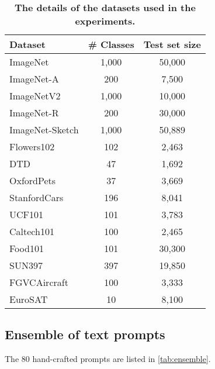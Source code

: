 \begin{table}[t]
\centering
\caption{\textbf{The details of the datasets used in the experiments.}}
\label{tab:dataset}
\begin{tabular}{lcc}
\toprule
\textbf{Dataset} & \textbf{\# Classes} & \textbf{Test set size} \\
\midrule
ImageNet \cite{deng2009imagenet} & 1,000 & 50,000 \\
ImageNet-A \citep{hendrycks2021natural} & 200 & 7,500 \\
ImageNetV2 \citep{recht2019imagenet} & 1,000 & 10,000 \\
ImageNet-R \citep{hendrycks2021many} & 200 & 30,000 \\
ImageNet-Sketch \citep{wang2019learning} & 1,000 & 50,889 \\
\midrule
\midrule
Flowers102 \citep{nilsback2008automated} & 102 & 2,463 \\
DTD \citep{cimpoi2014describing} & 47 & 1,692 \\
OxfordPets \citep{parkhi2012cats} & 37 & 3,669 \\
StanfordCars \citep{krause20133d} & 196 & 8,041 \\
UCF101 \citep{soomro2012ucf101} & 101 & 3,783 \\
Caltech101 \citep{li2022caltech} & 100 & 2,465 \\
Food101 \citep{bossard2014food} & 101 & 30,300 \\
SUN397 \citep{xiao2010sun} & 397 & 19,850 \\
FGVCAircraft \citep{maji2013fine} & 100 & 3,333 \\
EuroSAT \citep{helber2019eurosat} & 10 & 8,100 \\
\bottomrule
\end{tabular}
\end{table}

\subsection{Ensemble of text prompts}
The 80 hand-crafted prompts are listed in \cref{tab:ensemble}.

